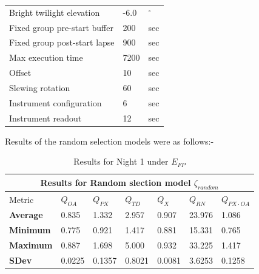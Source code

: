 \begin{landscape}
\begin{table}
\begin{center}
{\begin{tabular}{lll}
Bright twilight elevation & -6.0  & $^{\circ}$\\
Fixed group pre-start buffer & 200 & sec\\
Fixed group post-start lapse & 900 & sec\\
Max execution time & 7200 & sec\\
Offset & 10 & sec\\
Slewing rotation & 60 & sec \\
Instrument configuration & 6 &sec \\
Instrument readout & 12 & sec\\
\bottomrule
\end{tabular}
}
\end{center}
\end{table}
\end{landscape}

Results of the random selection models were as follows:-

\clearpage
\begin{table}
\begin{center}
\begin{tabular}{lllllll}
\toprule
\multicolumn{7}{c}{Results for Random slection model $\zeta_{random}$} \\
\midrule
Metric & $Q_{OA}$ & $Q_{PX}$ & $Q_{TD}$ & $Q_{X}$ & $Q_{RN}$ & $Q_{PX \cdot OA}$ \\
\midrule
{\bf Average} & 0.835  & 1.332  & 2.957  & 0.907  & 23.976 & 1.086\\
{\bf Minimum} & 0.775  & 0.921  & 1.417  & 0.881  & 15.331 & 0.765\\
{\bf Maximum} & 0.887  & 1.698  & 5.000  & 0.932  & 33.225 & 1.417\\
{\bf SDev}    & 0.0225 & 0.1357 & 0.8021 & 0.0081 & 3.6253 & 0.1258\\
\bottomrule
\end{tabular}
\end{center}
\caption{Results for Night 1 under $E_{FP}$}
\end{table}

